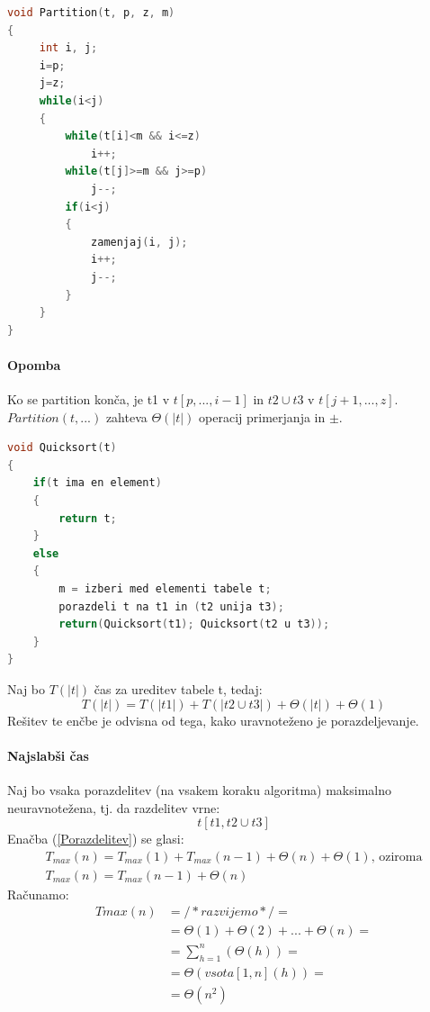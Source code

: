 \documentclass[a4paper,10pt]{article}
\begin{document}
\begin{lstlisting}[language=c, caption={Primer metode, ki razdeli elemente v podtabele}]
void Partition(t, p, z, m)
{
	 int i, j;
	 i=p;
	 j=z;
	 while(i<j)
	 {
		 while(t[i]<m && i<=z)
			 i++;
		 while(t[j]>=m && j>=p)
			 j--;
		 if(i<j)
		 {
			 zamenjaj(i, j);
			 i++;
			 j--;
		 }
	 }
}
\end{lstlisting}

\paragraph{Opomba}
Ko se partition kon\v ca, je t1 v $t[p,...,i-1]$ in $t2 \cup t3$ v $t[j+1,...,z]$. $Partition(t,...)$ zahteva $\Theta (|t|)$ operacij primerjanja in $\pm$.

\begin{lstlisting}[language=c, caption={Celoten algoritem za hitro sortiranje}]
void Quicksort(t)
{
	if(t ima en element)
	{
		return t;
	}
	else
	{
		m = izberi med elementi tabele t;
		porazdeli t na t1 in (t2 unija t3);
		return(Quicksort(t1); Quicksort(t2 u t3));
	}
}
\end{lstlisting}
Naj bo $T(|t|)$ \v cas za ureditev tabele t, tedaj:
	\begin{equation}
	T(|t|) = T(|t1|) + T(|t2 \cup t3|) + \Theta (|t|)+ \Theta (1)
	\label{Porazdelitev}
	\end{equation}
Re\v sitev te en\v cbe je odvisna od tega, kako uravnote\v zeno je porazdeljevanje.\\

\paragraph{Najslab\v si \v cas}
Naj bo vsaka porazdelitev (na vsakem koraku algoritma) maksimalno neuravnote\v zena, tj. da razdelitev vrne:
	$$t[t1, t2 \cup t3]$$
Ena\v cba (\ref{Porazdelitev}) se glasi:
$$
\begin{array}{c}
T_{max}(n) = T_{max}(1) + T_{max}(n-1) + \Theta (n) + \Theta (1) \mbox{, oziroma} \\
T_{max}(n)=T_{max}(n-1) + \Theta (n)
\end{array}
$$
Ra\v cunamo:
$$
\begin{array}{ll}
Tmax(n) & = /*razvijemo*/ = \\
 & = \Theta (1)+\Theta (2)+...+\Theta (n) = \\
 & = \sum_{h=1}^n (\Theta (h)) = \\
 & = \Theta (vsota[1, n](h)) = \\
 & = \Theta (n^2)
\end{array}
$$
\end{document}
